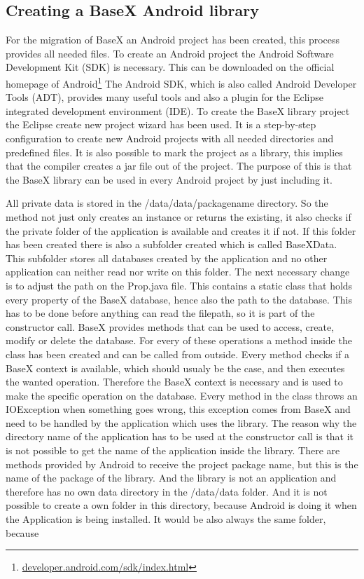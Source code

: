 \subsection{Creating a BaseX Android library}
\label{sec:migration:creating-a-basex-android-library}
For the migration of BaseX an Android project has been created, this process provides all needed files.
To create an Android project the Android Software Development Kit (SDK) is necessary.
This can be downloaded on the official homepage of Android\footnote{\url{developer.android.com/sdk/index.html}}
The Android SDK, which is also called Android Developer Tools (ADT), provides many useful tools and also a plugin for the Eclipse integrated development environment (IDE).
To create the BaseX library project the Eclipse create new project wizard has been used.
It is a step-by-step configuration to create new Android projects with all needed directories and predefined files.
It is also possible to mark the project as a library, this implies that the compiler creates a jar file out of the project.
The purpose of this is that the BaseX library can be used in every Android project by just including it.




All private data is stored in the /data/data/packagename directory.
So the method not just only creates an instance or returns the existing, it also checks if the private folder of the application is available and creates it if not.
If this folder has been created there is also a subfolder created which is called BaseXData.
This subfolder stores all databases created by the application and no other application can neither read nor write on this folder.
The next necessary change is to adjust the path on the Prop.java file.
This contains a static class that holds every property of the BaseX database, hence also the path to the database.
This has to be done before anything can read the filepath, so it is part of the constructor call.
BaseX provides methods that can be used to access, create, modify or delete the database.
For every of these operations a method inside the class has been created and can be called from outside.
Every method checks if a BaseX context is available, which should usualy be the case, and then executes the wanted operation.
Therefore the BaseX context is necessary and is used to make the specific operation on the database.
Every method in the class throws an IOException when something goes wrong, this exception comes from BaseX and need to be handled by the application which uses the library.
The reason why the directory name of the application has to be used at the constructor call is that it is not possible to get the name of the application inside the library.
There are methods provided by Android to receive the project package name, but this is the name of the package of the library.
And the library is not an application and therefore has no own data directory in the /data/data folder.
And it is not possible to create a own folder in this directory, because Android is doing it when the Application is being installed.
It would be also always the same folder, because 



